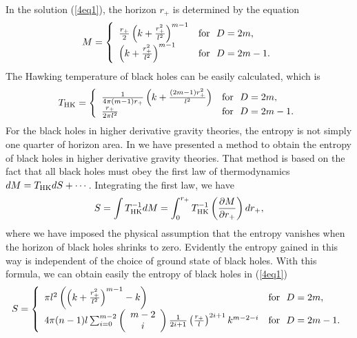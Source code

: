 \documentclass[a4paper,12pt]{article}
\begin{document}
    
In the solution (\ref{4eq1}), the horizon $r_+$ is determined by the equation
\begin{equation}
\label{4eq3}
M =\left \{ 
\begin{array}{ll}
\frac{r_+}{2}\left(k +\frac{r_+^2}{l^2}\right )^{m-1} & {\rm for }\ \  D=2m, 
     \\ 
\left( k+\frac{r_+^2}{l^2} \right)^{m-1} & {\rm for}\ \  D=2m-1.
\end{array} \right.
\end{equation}
The Hawking temperature of black holes can be easily calculated, which is
\begin{equation}
T_{\rm HK} = \left \{
\begin{array}{ll}
\frac{1}{4\pi (m-1) r_+}\left (k +\frac{(2m-1)r_+^2}{l^2}\right) & {\rm for}
  \ \  D=2m, \\
\frac{r_+}{2\pi l^2} & {\rm for}\ \ D=2m-1.
\end{array} \right.
\end{equation}
For the black holes in higher derivative gravity theories, the entropy is
not simply one quarter of horizon area.   In \cite{CS} we have presented
a method to obtain the entropy of black holes in higher derivative gravity
theories. That method is based on the fact that all black holes must obey 
the first law of thermodynamics $dM =T_{\rm HK}dS +\cdots$. Integrating the 
first law, we have
 \begin{equation}
S =\int T_{\rm HK}^{-1} dM =\int^{r_+}_0 T^{-1}_{\rm HK} \left(
    \frac{\partial M} {\partial r_+}\right) dr_+,
\end{equation}
where we have imposed the physical assumption that the entropy vanishes when
the horizon of black holes shrinks to zero. Evidently the entropy gained in
 this
way is independent of the choice of ground state of black holes. With this 
formula,  we can obtain easily the entropy of black holes in (\ref{4eq1})
\begin{equation}
\label{4eq6}
S =\left \{
\begin{array}{ll}
 \pi l^2\left ( \left(k+\frac{r_+^2}{l^2}\right)^{m-1}-k\right) &
   {\rm for}\ \  D=2m, \\
4\pi (n-1) l \sum_{i=0}^{m-2}\left(
\begin{array}{c}
m-2 \\ i 
\end{array} \right) 
\frac{1}{2i +1}\left(\frac{r_+}{l}\right)^{2i+1}k^{m-2-i}
   & {\rm for}\ \ D=2m-1.
\end{array} \right.
\end{equation}
\end{document}
